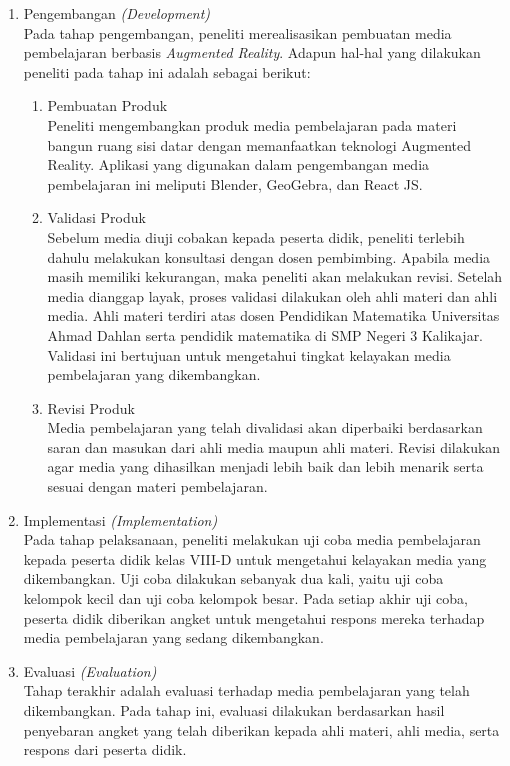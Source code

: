 \documentclass[12pt]{article}
\begin{document}
\begin{enumerate}
    \item Pengembangan \textit{(Development)}\\
    \hspace*{1cm}Pada tahap pengembangan, peneliti merealisasikan pembuatan media pembelajaran berbasis \textit{Augmented Reality}. Adapun hal-hal yang dilakukan peneliti pada tahap ini adalah sebagai berikut:
    \begin{enumerate}
        \item Pembuatan Produk\\
        \hspace*{1cm}Peneliti mengembangkan produk media pembelajaran pada materi bangun ruang sisi datar dengan memanfaatkan teknologi Augmented Reality. Aplikasi yang digunakan dalam pengembangan media pembelajaran ini meliputi Blender, GeoGebra, dan React JS.
        \item Validasi Produk\\
        \hspace*{1cm}Sebelum media diuji cobakan kepada peserta didik, peneliti terlebih dahulu melakukan konsultasi dengan dosen pembimbing. Apabila media masih memiliki kekurangan, maka peneliti akan melakukan revisi. Setelah media dianggap layak, proses validasi dilakukan oleh ahli materi dan ahli media. Ahli materi terdiri atas dosen Pendidikan Matematika Universitas Ahmad Dahlan serta pendidik matematika di SMP Negeri 3 Kalikajar. Validasi ini bertujuan untuk mengetahui tingkat kelayakan media pembelajaran yang dikembangkan.
        \item Revisi Produk\\
        \hspace*{1cm}Media pembelajaran yang telah divalidasi akan diperbaiki berdasarkan saran dan masukan dari ahli media maupun ahli materi. Revisi dilakukan agar media yang dihasilkan menjadi lebih baik dan lebih menarik serta sesuai dengan materi pembelajaran.
    \end{enumerate}
    \item Implementasi \textit{(Implementation)}\\
    \hspace*{1cm}Pada tahap pelaksanaan, peneliti melakukan uji coba media pembelajaran kepada peserta didik kelas VIII-D untuk mengetahui kelayakan media yang dikembangkan. Uji coba dilakukan sebanyak dua kali, yaitu uji coba kelompok kecil dan uji coba kelompok besar. Pada setiap akhir uji coba, peserta didik diberikan angket untuk mengetahui respons mereka terhadap media pembelajaran yang sedang dikembangkan.

    \item Evaluasi \textit{(Evaluation)}\\
    \hspace*{1cm}Tahap terakhir adalah evaluasi terhadap media pembelajaran yang telah dikembangkan. Pada tahap ini, evaluasi dilakukan berdasarkan hasil penyebaran angket yang telah diberikan kepada ahli materi, ahli media, serta respons dari peserta didik.\\


\end{enumerate}
\end{document}
